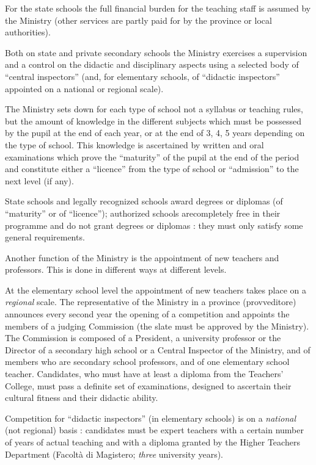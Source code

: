 For the state schools the full financial burden for the teaching staff is assumed by the Ministry (other services are partly paid for by the province or local authorities).

Both on state and private secondary schools the Ministry exercises a supervision and a control on the didactic and disciplinary aspects using a selected body of ``central inspectors'' (and, for elementary schools, of ``didactic inspectors'' appointed on a national or regional scale).

The Ministry sets down for each type of school not a syllabus or teaching rules, but the amount of knowledge in the different subjects which must be possessed by the pupil at the end of each year, or at the end of 3, 4, 5 years depending on the type of school. This knowledge is ascertained by written and oral examinations which prove the ``maturity'' of the pupil at the end of the period and constitute either a ``licence'' from the type of school or ``admission'' to the next level (if any).

State schools and legally recognized schools award degrees or diplomas (of ``maturity'' or of ``licence''); authorized schools are\pageoriginale completely free in their programme and do not grant degrees or diplomas : they must only satisfy some general requirements.

Another function of the Ministry is the appointment of new teachers and professors. This is done in different ways at different levels.

At the elementary school level the appointment of new teachers takes place on a {\em regional} scale. The representative of the Ministry in a province (provveditore) announces every second year the opening of a competition and appoints the members of a judging Commission (the slate must be approved by the Ministry). The Commission is composed of a President, a university professor or the Director of a secondary high school or a Central Inspector of the Ministry, and of members who are secondary school professors, and of one elementary school teacher. Candidates, who must have at least a diploma from the Teachers' College, must pass a definite set of examinations, designed to ascertain their cultural fitness and their didactic ability.

Competition for ``didactic inspectors'' (in elementary schools) is on a {\em national} (not regional) basis : candidates must be expert teachers with a certain number of years of actual teaching and with a diploma granted by the Higher Teachers Department (Facolt\`a di Magistero; {\em three} university years).

